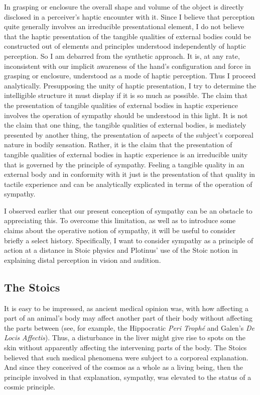 In grasping or enclosure the overall shape and volume of the object is directly disclosed in a perceiver's haptic encounter with it. Since I believe that perception quite generally involves an irreducible presentational element, I do not believe that the haptic presentation of the tangible qualities of external bodies could be constructed out of elements and principles understood independently of haptic perception. So I am debarred from the synthetic approach. It is, at any rate, inconsistent with our implicit awareness of the hand's configuration and force in grasping or enclosure, understood as a mode of haptic perception. Thus I proceed analytically. Presupposing the unity of haptic presentation, I try to determine the intelligible structure it must display if it is so much as possible. The claim that the presentation of tangible qualities of external bodies in haptic experience involves the operation of sympathy should be understood in this light. It is not the claim that one thing, the tangible qualities of external bodies, is mediately presented by another thing, the presentation of aspects of the subject's corporeal nature in bodily sensation. Rather, it is the claim that the presentation of tangible qualities of external bodies in haptic experience is an irreducible unity that is governed by the principle of sympathy. Feeling a tangible quality in an external body and in conformity with it just is the presentation of that quality in tactile experience and can be analytically explicated in terms of the operation of sympathy.

I observed earlier that our present conception of sympathy can be an obstacle to appreciating this. To overcome this limitation, as well as to introduce some claims about the operative notion of sympathy, it will be useful to consider briefly a select history. Specifically, I want to consider sympathy as a principle of action at a distance in Stoic physics and Plotinus' use of the Stoic notion in explaining distal perception in vision and audition. 

\subsection{The Stoics} %
\label{sec:the_stoics}

It is easy to be impressed, as ancient medical opinion was, with how affecting a part of an animal's body may affect another part of their body without affecting the parts between (see, for example, the Hippocratic \emph{Peri Troph\'{e}} and Galen's \emph{De Locis Affectis}). Thus, a disturbance in the liver might give rise to spots on the skin without apparently affecting the intervening parts of the body. The Stoics believed that such medical phenomena were subject to a corporeal explanation. And since they conceived of the cosmos as a whole as a living being, then the principle involved in that explanation, sympathy, was elevated to the status of a cosmic principle.

